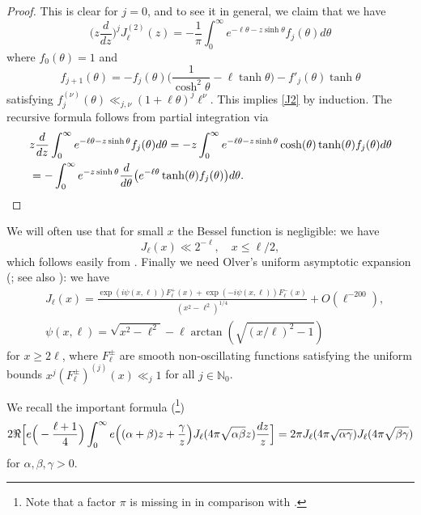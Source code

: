 \documentclass[11pt]{amsart}
\numberwithin{equation}{section}
\theoremstyle{plain}
\theoremstyle{definition}
\renewcommand{\geq}{\geqslant}
\renewcommand{\leq}{\le}
\numberwithin{equation}{section}
\begin{document}
\begin{proof}
This is clear for $j=0$, and to see it in general, we claim that  we have
\[  \Big(z \frac{d}{dz}\Big)^j J_{\ell}^{(2)}(z) = -\frac{1}{\pi} \int_0^{\infty} e^{-\ell \theta - z\sinh\theta} f_j(  \theta) d\theta \]
where $f_0(\theta) = 1$ and 
\[ f_{j+1}( \theta) = -f_j(\theta)\Big( \frac{1}{\cosh^2\theta} - \ell \tanh\theta\Big) - f'_j(\theta)\tanh\theta \]
satisfying $f^{(\nu)}_j(\theta) \ll_{j, \nu} (1 + \ell \theta)^j \ell^{\nu}.$
This implies \eqref{J2} by induction. The recursive formula follows from partial integration via
\begin{align}
&z \frac{d}{dz} \int_0^{\infty} e^{-\ell \theta - z\sinh\theta} f_j(  \theta) d\theta = -z\int_0^{\infty} e^{-\ell \theta - z\sinh\theta}\cosh(\theta) \tanh(\theta) f_j(  \theta) d\theta \\
& = %
- \int_0^{\infty} e^{  - z\sinh\theta}\frac{d}{d\theta} \big(e^{-\ell \theta} \tanh(\theta) f_j(  \theta)\big) d\theta . \qedhere
\end{align}
\end{proof}

We will often use that for small $x$ the Bessel function is negligible: we have
\begin{equation}\label{bes1}
  J_{\ell}(x) \ll 2^{-\ell}, \quad x \leq \ell/2, 
\end{equation}
which follows easily from \cite[8.411.4]{GR}. 
Finally we need   Olver's uniform asymptotic expansion (\cite[(4.24)]{Ol}; see also \cite[(4.4)]{Bl}): we have
\begin{align}\label{unif}
& J_{\ell}(x) =  \frac{\exp(i\psi(x, \ell) ) F_{\ell}^{+}(x) + \exp(-i\psi(x, \ell) ) F^{-}_{\ell}(x)}{(x^2 - \ell^2)^{1/4}} + O(\ell^{-200}), \\
& \psi(x, \ell) =  \sqrt{x^2 - \ell^2} - \ell \arctan(\sqrt{(x/\ell)^2 - 1})
\end{align}
for $x \geq 2\ell$, where $F_{\ell}^{\pm}$ are smooth non-oscillating functions  satisfying the uniform bounds $x^j (F_{\ell}^{\pm})^{(j)}(x) \ll_j 1$ for all $j \in \mathbb{N}_0$.  

We recall the important formula (\cite[2.12.20]{PBM}\footnote{Note that a factor $\pi$ is missing in \cite[2.12.20.5]{PBM}  in comparison with \cite[2.12.20.2/3]{PBM}.})
\begin{equation}\label{bes4}
2\Re \Bigl[ e\Big(- \frac{\ell+1}{4}\Big) \int_0^{\infty} e\Big((\alpha+\beta)z + \frac{\gamma}{z}\Big)J_{\ell}(4\pi \sqrt{\alpha \beta}z )\frac{dz}{z}\Bigr]    = 2\pi J_{\ell}(4\pi \sqrt{\alpha \gamma}) J_{\ell}(4\pi \sqrt{\beta \gamma}) 
\end{equation}
for $\alpha, \beta, \gamma > 0$. 
\end{document}
